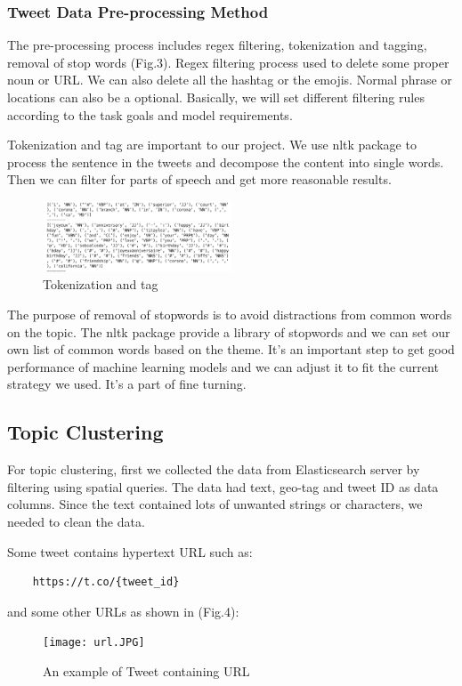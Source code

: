\subsubsection{Tweet Data Pre-processing Method}
The pre-processing process includes regex filtering, tokenization and tagging,
removal of stop words (Fig.3). Regex filtering process used to delete some
proper noun or URL. We can also delete all the hashtag or the emojis. Normal
phrase or locations can also be a optional. Basically, we will set different
filtering rules according to the task goals and model requirements. 

Tokenization and tag are important to our project. We use nltk package to
process the sentence in the tweets and decompose the content into single
words. Then we can filter for parts of speech and get more reasonable
results. 
\begin{figure}[h]
\centering
\includegraphics[width=0.5\textwidth]{imgs/tokenization.png}
\caption{\label{fig:Research process} Tokenization and tag}
\end{figure}
The purpose of removal of stopwords is to avoid distractions from common words
on the topic. The nltk package provide a library of stopwords and we can set
our own list of common words based on the theme. It's an important step to
get good performance of machine learning models and we can adjust it to fit
the current strategy we used. It's a part of fine turning. 

\subsection{Topic Clustering}
For topic clustering, first we collected the data from Elasticsearch server by
filtering using spatial queries. The data had text, geo-tag and tweet ID as
data columns. Since the text contained lots of unwanted strings or
characters, we needed to clean the data. 

Some tweet contains hypertext URL such as: 
\begin{verbatim}
    https://t.co/{tweet_id}
\end{verbatim} and some other URLs as shown in (Fig.4):
\begin{figure}[H]
    \centering
    \texttt{[image: url.JPG]}
    \caption{An example of Tweet containing URL}
    \label{fig:tw_url}
\end{figure}
    

